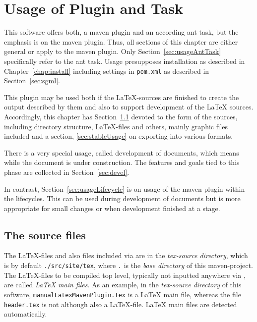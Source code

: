
\chapter{Usage of Plugin and Task}\label{chap:usage}

This software offers both, a maven plugin and an according ant task,
but the emphasis is on the maven plugin.
Thus, all sections of this chapter are either general
or apply to the maven plugin.
Only Section~\ref{sec:usageAntTask} specifically refer to the ant task. 
Usage presupposes installation as described in Chapter~\ref{chap:install}
including settings in \texttt{pom.xml}
as described in Section~\ref{sec:sgml}.

This plugin may be used both if the \LaTeX-sources are finished 
to create the output described by them 
and also to support development of the \LaTeX{} sources. 
Accordingly, this chapter has Section~\ref{sec:sources}
devoted to the form of the sources, including directory structure,
\LaTeX-files and others, mainly graphic files included
and a section, \ref{sec:stableUsage} on exporting into various formats.

There is a very special usage, called development of documents,
which means while the document is under construction.
The features and goals tied to this phase
are collected in Section~\ref{sec:devel}.

In contrast, Section~\ref{sec:usageLifecycle}
is on usage of the maven plugin within the lifecycles.
This can be used during development of documents
but is more appropriate for small changes
or when development finished at a stage. 



\section{The source files}\label{sec:sources}

The \LaTeX-files and also files included via  
are in the {\em tex-source directory}, 
which is by default \texttt{./src/site/tex}, 
where \texttt{.} is the {\em base directory\/} of this maven-project. 
The \LaTeX-files to be compiled top level, 
typically not inputted anywhere via , 
are called {\em \LaTeX{} main files}. 
As an example, 
in the {\em tex-source directory\/} of this software, 
\texttt{manualLatexMavenPlugin.tex} is a \LaTeX{} main file, 
whereas the file \texttt{header.tex} is not although also a \LaTeX-file. 
\LaTeX{} main files are detected automatically. 

